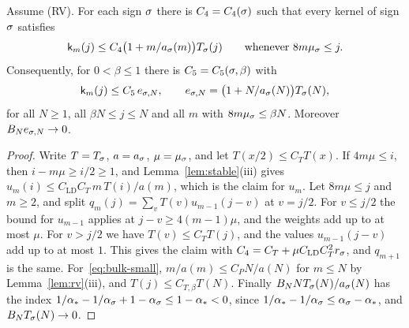 \begin{lemma}\label{lem:small}
Assume (RV). For each sign $\sigma$ there is $C_4=C_4(\sigma)$ such that every kernel
of sign $\sigma$ satisfies
\[
 \mathsf k_m(j)\le C_4\bigl(1+m/a_\sigma(m)\bigr)T_\sigma(j)\qquad\text{whenever }8m\mu_\sigma\le j .
\]
Consequently, for $0<\beta\le1$ there is $C_5=C_5(\sigma,\beta)$ with
\begin{equation}\label{eq:bulk-small}
 \mathsf k_m(j)\le C_5\,e_{\sigma,N},\qquad e_{\sigma,N}=\bigl(1+N/a_\sigma(N)\bigr)T_\sigma(N),
\end{equation}
for all $N\ge1$, all $\beta N\le j\le N$ and all $m$ with $8m\mu_\sigma\le\beta N$.
Moreover $B_Ne_{\sigma,N}\to0$.
\end{lemma}

\begin{proof}
Write $T=T_\sigma$, $a=a_\sigma$, $\mu=\mu_\sigma$, and let $T(x/2)\le C_TT(x)$. If
$4m\mu\le i$, then $i-m\mu\ge i/2\ge1$, and Lemma~\ref{lem:stable}(iii) gives
$u_m(i)\le C_{\mathrm{LD}}C_T\,m\,T(i)/a(m)$, which is the claim for $u_m$. Let
$8m\mu\le j$ and $m\ge2$, and split $q_m(j)=\sum_vT(v)u_{m-1}(j-v)$ at $v=j/2$. For
$v\le j/2$ the bound for $u_{m-1}$ applies at $j-v\ge4(m-1)\mu$, and the weights add up
to at most $\mu$. For $v>j/2$ we have $T(v)\le C_TT(j)$, and the values $u_{m-1}(j-v)$
add up to at most $1$. This gives the claim with $C_4=C_T+\mu C_{\mathrm{LD}}C_T^2r_\sigma$,
and $q_{m+1}$ is the same. For~\eqref{eq:bulk-small}, $m/a(m)\le C_PN/a(N)$ for $m\le N$
by Lemma~\ref{lem:rv}(iii), and $T(j)\le C_{T,\beta}T(N)$. Finally
$B_NNT_\sigma(N)/a_\sigma(N)$ has the index
$1/\alpha_*-1/\alpha_\sigma+1-\alpha_\sigma\le1-\alpha_*<0$, since
$1/\alpha_*-1/\alpha_\sigma\le\alpha_\sigma-\alpha_*$, and $B_NT_\sigma(N)\to0$.
\end{proof}
